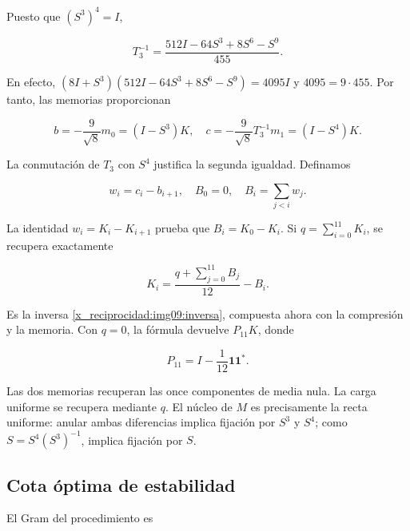 Puesto que \((S^3)^4=I\),



\begin{equation}
T_3^{-1}=\frac{512I-64S^3+8S^6-S^9}{455}.
\label{x_reciprocidad:nuc11:eq:3}
\end{equation}



En efecto,
\((8I+S^3)(512I-64S^3+8S^6-S^9)=4095I\)
y \(4095=9\cdot455\).
Por tanto, las memorias proporcionan



\begin{equation}
b=-\frac9{\sqrt8}m_0=(I-S^3)K,
\quad c=-\frac9{\sqrt8}T_3^{-1}m_1=(I-S^4)K.
\label{x_reciprocidad:nuc11:eq:4}
\end{equation}



La conmutación de \(T_3\) con \(S^4\) justifica la segunda igualdad.
Definamos



\[
w_i=c_i-b_{i+1},\quad B_0=0,\quad
B_i=\sum_{j<i}w_j.
\]



La identidad \(w_i=K_i-K_{i+1}\) prueba que \(B_i=K_0-K_i\).
Si \(q=\sum_{i=0}^{11}K_i\), se recupera exactamente



\begin{equation}
K_i=\frac{q+\sum_{j=0}^{11}B_j}{12}-B_i.
\label{x_reciprocidad:nuc11:eq:5}
\end{equation}



Es la inversa \eqref{x_reciprocidad:img09:inversa}, compuesta ahora con la
compresión y la memoria. Con \(q=0\), la fórmula devuelve
\(P_{11}K\), donde



\[
P_{11}=I-\frac1{12}\mathbf1\mathbf1^*.
\]



Las dos memorias recuperan las once componentes de media nula.
La carga uniforme se recupera mediante \(q\).
El núcleo de \(M\) es precisamente la recta uniforme:
anular ambas diferencias implica fijación por \(S^3\) y \(S^4\);
como \(S=S^4(S^3)^{-1}\), implica fijación por \(S\).

\subsection{Cota óptima de estabilidad}

El Gram del procedimiento es



